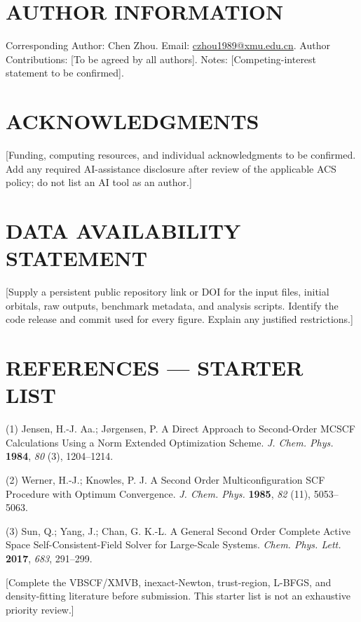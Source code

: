 \documentclass[12pt]{article}
\begin{document}
\section*{AUTHOR INFORMATION}

Corresponding Author: Chen Zhou. Email: \href{mailto:czhou1989@xmu.edu.cn}{czhou1989@xmu.edu.cn}. Author Contributions: [To be agreed by all authors]. Notes: [Competing-interest statement to be confirmed].


\section*{ACKNOWLEDGMENTS}

[Funding, computing resources, and individual acknowledgments to be confirmed. Add any required AI-assistance disclosure after review of the applicable ACS policy; do not list an AI tool as an author.]


\section*{DATA AVAILABILITY STATEMENT}

[Supply a persistent public repository link or DOI for the input files, initial orbitals, raw outputs, benchmark metadata, and analysis scripts. Identify the code release and commit used for every figure. Explain any justified restrictions.]


\section*{REFERENCES --- STARTER LIST}

(1) Jensen, H.-J. Aa.; Jørgensen, P. A Direct Approach to Second-Order MCSCF Calculations Using a Norm Extended Optimization Scheme. \textit{J. Chem. Phys.} \textbf{1984}, \textit{80} (3), 1204--1214.


(2) Werner, H.-J.; Knowles, P. J. A Second Order Multiconfiguration SCF Procedure with Optimum Convergence. \textit{J. Chem. Phys.} \textbf{1985}, \textit{82} (11), 5053--5063.


(3) Sun, Q.; Yang, J.; Chan, G. K.-L. A General Second Order Complete Active Space Self-Consistent-Field Solver for Large-Scale Systems. \textit{Chem. Phys. Lett.} \textbf{2017}, \textit{683}, 291--299.


[Complete the VBSCF/XMVB, inexact-Newton, trust-region, L-BFGS, and density-fitting literature before submission. This starter list is not an exhaustive priority review.]
\end{document}
